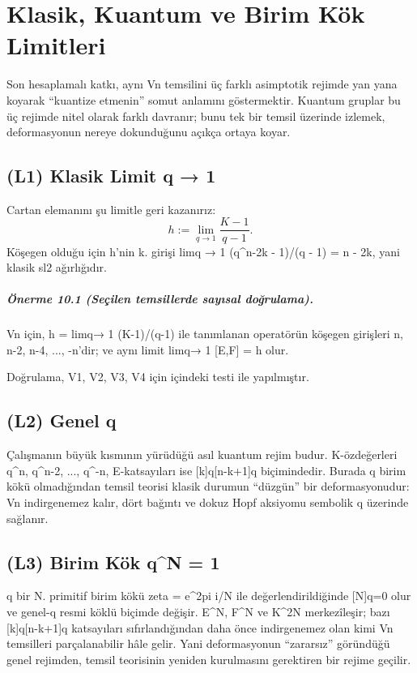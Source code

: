 \documentclass[12pt,a4paper]{report}
\numberwithin{equation}{chapter}
\theoremstyle{plain}
\theoremstyle{definition}
\begin{document}
\chapter{Klasik, Kuantum ve Birim Kök Limitleri}\label{sec:limits}

Son hesaplamalı katkı, aynı Vn temsilini üç farklı asimptotik rejimde yan
yana koyarak ``kuantize etmenin'' somut anlamını göstermektir. Kuantum gruplar
bu üç rejimde nitel olarak farklı davranır; bunu tek bir temsil üzerinde
izlemek, deformasyonun nereye dokunduğunu açıkça ortaya koyar.

\section{(L1) Klasik Limit q → 1}

Cartan elemanını şu limitle geri kazanırız:
\[
  h := \lim_{q \to 1} \frac{K - 1}{q - 1}.
\]
Köşegen olduğu için h'nin k. girişi
limq → 1 (q^n-2k - 1)/(q - 1) = n - 2k, yani klasik
sl2 ağırlığıdır.

\paragraph{Önerme 10.1 (Seçilen temsillerde sayısal doğrulama).}\label{thm:classical}
Vn için, h = limq→ 1 (K-1)/(q-1) ile tanımlanan operatörün
köşegen girişleri n, n-2, n-4, ..., -n'dir; ve aynı limit
limq→ 1 [E,F] = h olur.


Doğrulama, V1, V2, V3, V4 için 
içindeki  testi ile
yapılmıştır.

\section{(L2) Genel q}

Çalışmanın büyük kısmının yürüdüğü asıl kuantum rejim budur. K-özdeğerleri
q^n, q^n-2, ..., q^-n, E-katsayıları ise [k]q[n-k+1]q
biçimindedir. Burada q birim kökü olmadığından temsil teorisi klasik durumun
``düzgün'' bir deformasyonudur: Vn indirgenemez kalır, dört bağıntı ve dokuz
Hopf aksiyomu sembolik q üzerinde sağlanır.

\section{(L3) Birim Kök q^N = 1}

q bir N. primitif birim kökü zeta = e^2pi i/N ile değerlendirildiğinde
[N]q=0 olur ve genel-q resmi köklü biçimde değişir. E^N, F^N ve
K^2N merkezîleşir; bazı [k]q[n-k+1]q katsayıları sıfırlandığından
daha önce indirgenemez olan kimi Vn temsilleri parçalanabilir hâle gelir.
Yani deformasyonun ``zararsız'' göründüğü genel rejimden, temsil teorisinin
yeniden kurulmasını gerektiren bir rejime geçilir.
\end{document}

